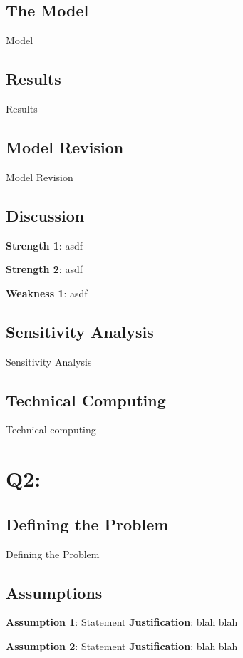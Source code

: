 \documentclass{mcm}
\numberwithin{figure}{section}
\numberwithin{table}{section}
\numberwithin{equation}{section}
\begin{document}
    \subsection{The Model}
    Model

    \subsection{Results}
    Results

    \subsection{Model Revision}
    Model Revision

    \subsection{Discussion}
    
    \noindent\textbf{Strength 1}: asdf

    \noindent\textbf{Strength 2}: asdf

    \noindent\textbf{Weakness 1}: asdf

    \subsection{Sensitivity Analysis}
    Sensitivity Analysis

    \subsection{Technical Computing}
    Technical computing

    \section{Q2:}

    \subsection{Defining the Problem}
    Defining the Problem

    \subsection{Assumptions}
    \noindent\textbf{Assumption 1}: Statement
    \textbf{Justification}: blah blah

    \noindent\textbf{Assumption 2}: Statement
    \textbf{Justification}: blah blah
\end{document}
